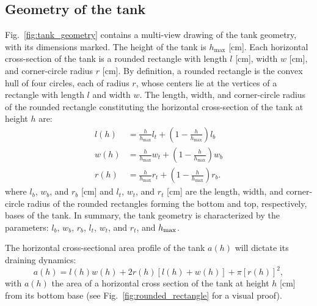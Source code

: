 \documentclass[a4paper,fleqn]{cas-dc}
\begin{document}
\subsection{Geometry of the tank}
Fig.~\ref{fig:tank_geometry} contains a multi-view drawing of the tank geometry, with its dimensions marked.
The height of the tank is $h_{\text{max}}$ [cm].
Each horizontal cross-section of the tank is a rounded rectangle with length $l$ [cm], width $w$ [cm], and corner-circle radius $r$ [cm].
By definition, a rounded rectangle is the convex hull of four circles, each of radius $r$, whose centers lie at the vertices of a rectangle with length $l$ and width $w$. \cite{rounded_rect}
The length, width, and corner-circle radius of the rounded rectangle constituting the horizontal cross-section of the tank at height $h$ are:
\begin{align}
	l(h) &= \frac{h}{h_{\text{max}}}l_t + \left(1-\frac{h}{h_{\text{max}}}\right) l_b \\
	w(h) &= \frac{h}{h_{\text{max}}}w_t + \left(1-\frac{h}{h_{\text{max}}}\right) w_b \\
	r(h) &= \frac{h}{h_{\text{max}}}r_t + \left(1-\frac{h}{h_{\text{max}}}\right) r_b.
\end{align}
where $l_b$, $w_b$, and $r_b$ [cm] and $l_t$, $w_t$, and $r_t$ [cm] are the length, width, and corner-circle radius of the rounded rectangles forming the bottom and top, respectively, bases of the tank.
In summary, the tank geometry is characterized by the parameters: $l_b$, $w_b$, $r_b$, $l_t$, $w_t$, and $r_t$, and $h_{\rm max}$.

The horizontal cross-sectional area profile of the tank $a(h)$ will dictate its draining dynamics:
\begin{equation}
	a(h) = l(h) w(h) + 2 r(h) [l(h) + w(h)] + \pi [r(h)]^2, \label{eq:a_of_h}
\end{equation}
with $a(h)$ the area of a horizontal cross section of the tank at height $h$ [cm] from its bottom base (see Fig.~\ref{fig:rounded_rectangle} for a visual proof).
%
\end{document}
